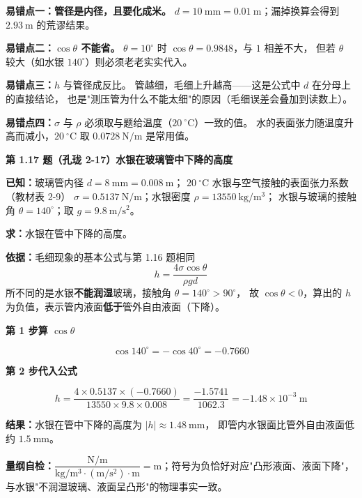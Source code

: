 \begin{yicuo}
\textbf{易错点一：管径是\textbf{内径}，且要化成米。}
$d=10\ \mathrm{mm}=0.01\ \mathrm{m}$；漏掉换算会得到 $2.93\ \mathrm{m}$ 的荒谬结果。

\textbf{易错点二：$\cos\theta$ 不能省。}
$\theta=10^{\circ}$ 时 $\cos\theta=0.9848$，与 $1$ 相差不大，
但若 $\theta$ 较大（如水银 $140^{\circ}$）则必须老老实实代入。

\textbf{易错点三：}$h$ 与管径成反比。
管越细，毛细上升越高——这是公式中 $d$ 在分母上的直接结论，
也是"测压管为什么不能太细"的原因（毛细误差会叠加到读数上）。

\textbf{易错点四：}$\sigma$ 与 $\rho$ 必须取与题给温度（$20\ ^{\circ}\mathrm{C}$）一致的值。
水的表面张力随温度升高而减小，$20\ ^{\circ}\mathrm{C}$ 取 $0.0728\ \mathrm{N/m}$ 是常用值。
\end{yicuo}

\noindent\textbf{第 1.17 题（孔珑 2-17）\quad 水银在玻璃管中下降的高度}

\begin{jie}
\textbf{已知：}玻璃管内径 $d=8\ \mathrm{mm}=0.008\ \mathrm{m}$；
$20\ ^{\circ}\mathrm{C}$ 水银与空气接触的表面张力系数（教材表 2-9）
$\sigma=0.5137\ \mathrm{N/m}$；水银密度 $\rho=13550\ \mathrm{kg/m^3}$；
水银与玻璃的接触角 $\theta=140^{\circ}$；取 $g=9.8\ \mathrm{m/s^2}$。

\textbf{求：}水银在管中下降的高度。

\textbf{依据：}毛细现象的基本公式与第 1.16 题相同
\[ h=\frac{4\sigma\cos\theta}{\rho g d} \]
所不同的是水银\textbf{不能润湿}玻璃，接触角 $\theta=140^{\circ}>90^{\circ}$，
故 $\cos\theta<0$，算出的 $h$ 为负值，表示管内液面\textbf{低于}管外自由液面（下降）。

\textbf{第 1 步\quad 算 $\cos\theta$}

\[ \cos 140^{\circ}=-\cos 40^{\circ}=-0.7660 \]

\textbf{第 2 步\quad 代入公式}

\[ h=\frac{4\times0.5137\times(-0.7660)}{13550\times9.8\times0.008}
     =\frac{-1.5741}{1062.3}=-1.48\times10^{-3}\ \mathrm{m} \]

\textbf{结果：}水银在管中下降的高度为 $|h|\approx1.48\ \mathrm{mm}$，
即管内水银面比管外自由液面低约 $1.5\ \mathrm{mm}$。

\textbf{量纲自检：}$\dfrac{\mathrm{N/m}}{\mathrm{kg/m^3}\cdot(\mathrm{m/s^2})\cdot\mathrm{m}}
=\mathrm{m}$；符号为负恰好对应"凸形液面、液面下降"，
与水银"不润湿玻璃、液面呈凸形"的物理事实一致。
\end{jie}

